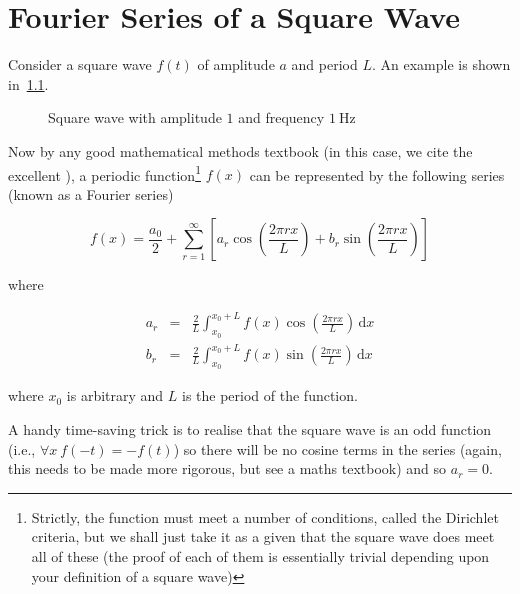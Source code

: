 \chapter{Fourier Series of a Square Wave}
\label{sec:squareWaveFourierSeries}

Consider a square wave $f(t)$ of amplitude $a$ and period $L$. An example is
shown in~\cref{fig:squareWave}.

\begin{figure}[h]
  \caption[Square wave]{Square wave with amplitude $1$ and frequency $\SI{1}{\Hz}$}
  \label{fig:squareWave}
\end{figure}

Now by any good mathematical methods textbook (in this case, we cite the
excellent \textcite{FourierSeries}), a periodic function\footnote{Strictly, the
  function must meet a number of conditions, called the Dirichlet criteria, but
we shall just take it as a given that the square wave does meet all of these
(the proof of each of them is essentially trivial depending upon your definition
of a square wave)} $f(x)$ can be represented by the following series (known as a
Fourier series)

\begin{equation*}
  f(x) = \frac{a_0}{2} + \sum_{r=1}^{\infty} \left[ a_r\cos\left(\frac{2\pi rx}{L}\right) + b_r\sin\left(\frac{2\pi rx}{L}\right)\right]
\end{equation*}

where

\begin{eqnarray*}
  a_r &=& \frac{2}{L} \int_{x_0}^{x_0+L} f(x)\cos\left(\frac{2\pi rx}{L}\right)\,\mathrm{d}x\\
  b_r &=& \frac{2}{L} \int_{x_0}^{x_0+L} f(x)\sin\left(\frac{2\pi rx}{L}\right)\,\mathrm{d}x
\end{eqnarray*}

where $x_0$ is arbitrary and $L$ is the period of the function.

A handy time-saving trick is to realise that the square wave is an odd function
(i.e., $\forall x\: f(-t)=-f(t)$) so there will be no cosine terms in the series
(again, this needs to be made more rigorous, but see a maths textbook) and so
$a_r=0$.

